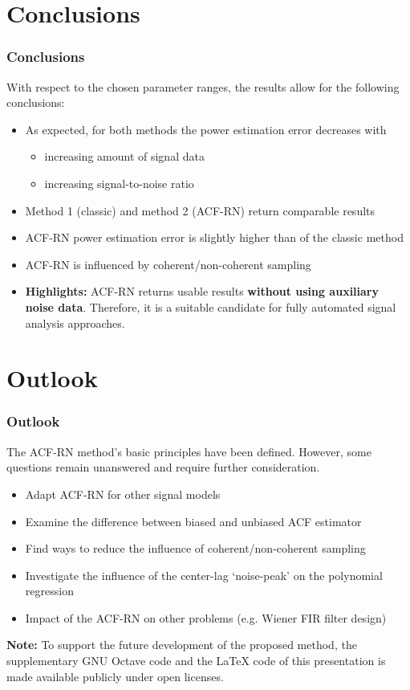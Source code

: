 \documentclass[11pt,aspectratio=169]{beamer}
\begin{document}
	\section{Conclusions}
	\begin{frame}
		\frametitle{Conclusions}
		With respect to the chosen parameter ranges, the results allow for the following conclusions:
		\vspace*{1em}
		\begin{itemize}
			\item As expected, for both methods the power estimation error decreases with
			\begin{itemize}
				\item increasing amount of signal data
				\item increasing signal-to-noise ratio
			\end{itemize}
			\item Method 1 (classic) and method 2 (ACF-RN) return comparable results
			\item ACF-RN power estimation error is slightly higher than of the classic method
			\item ACF-RN is influenced by coherent/non-coherent sampling
			\item \textbf{Highlights:} ACF-RN returns usable results \textbf{without using auxiliary noise data}. Therefore, it is a suitable candidate for fully automated signal analysis approaches.
		\end{itemize}
	\end{frame}
	\section{Outlook}
	\begin{frame}
		\frametitle{Outlook}
		The ACF-RN method's basic principles have been defined. However, some questions remain unanswered and require further consideration.
		\vspace*{1em}
		\begin{itemize}
			\item Adapt ACF-RN for other signal models
			\item Examine the difference between biased and unbiased ACF estimator
			\item Find ways to reduce the influence of coherent/non-coherent sampling
			\item Investigate the influence of the center-lag `noise-peak' on the polynomial regression
			\item Impact of the ACF-RN on other problems (e.g. Wiener FIR filter design)
		\end{itemize}
		\vspace*{.5em}
		\small \textbf{Note:} To support the future development of the proposed method, the supplementary GNU Octave code\autocite{progcode} and the \LaTeX{} code\autocite{texcode} of this presentation is made available publicly under open licenses.
	\end{frame}
\end{document}
